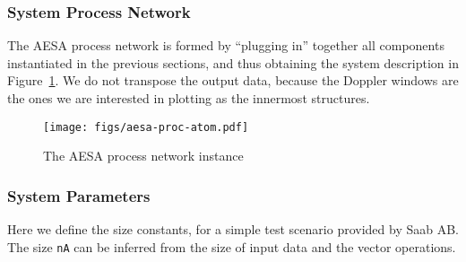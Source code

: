 \documentclass[
  a4paper,
]{article}
\newenvironment{Shaded}{}{}
\newcommand{\DataTypeTok}[1]{\textcolor[rgb]{0.56,0.13,0.00}{#1}}
\newcommand{\FunctionTok}[1]{\textcolor[rgb]{0.02,0.16,0.49}{#1}}
\newcommand{\KeywordTok}[1]{\textcolor[rgb]{0.00,0.44,0.13}{\textbf{#1}}}
\newcommand{\NormalTok}[1]{#1}
\newcommand{\OtherTok}[1]{\textcolor[rgb]{0.00,0.44,0.13}{#1}}
\begin{document}
\hypertarget{system-process-network}{%
\subsubsection{System Process Network}\label{system-process-network}}

The AESA process network is formed by ``plugging in'' together all
components instantiated in the previous sections, and thus obtaining the
system description in Figure~\ref{fig:cube-aesa-atom}. We do not
transpose the output data, because the Doppler windows are the ones we
are interested in plotting as the innermost structures.

\begin{figure}
\hypertarget{fig:cube-aesa-atom}{%
\centering
\texttt{[image: figs/aesa-proc-atom.pdf]}
\caption{The AESA process network instance}\label{fig:cube-aesa-atom}
}
\end{figure}

\begin{Shaded}
\end{Shaded}

\hypertarget{sec:aesa-parameters}{%
\subsubsection{System Parameters}\label{sec:aesa-parameters}}

Here we define the size constants, for a simple test scenario provided
by Saab AB. The size \texttt{nA} can be inferred from the size of input
data and the vector operations.
\end{document}
